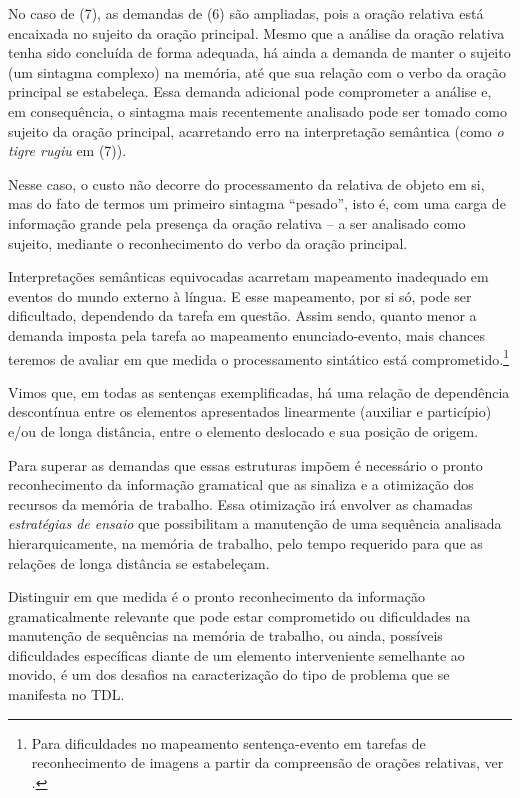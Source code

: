 \documentclass[output=paper,colorlinks,citecolor=brown,booklanguage=portuguese]{langscibook}
\begin{document}
No caso de (7), as demandas de (6) são ampliadas, pois a oração relativa está encaixada no sujeito da oração principal. Mesmo que a análise da oração relativa tenha sido concluída de forma adequada, há ainda a demanda de manter o sujeito (um sintagma complexo) na memória, até que sua relação com o verbo da oração principal se estabeleça. Essa demanda adicional pode comprometer a análise e, em consequência, o sintagma mais recentemente analisado pode ser tomado como sujeito da oração principal, acarretando erro na interpretação semântica (como \emph{o tigre rugiu} em (7)). 

Nesse caso, o custo não decorre do processamento da relativa de objeto em si, mas do fato de termos um primeiro sintagma “pesado”, isto é, com uma carga de informação grande pela presença da oração relativa – a ser analisado como sujeito, mediante o reconhecimento do verbo da oração principal. 

Interpretações semânticas equivocadas acarretam mapeamento inadequado em eventos do mundo externo à língua. E esse mapeamento, por si só, pode ser dificultado, dependendo da tarefa em questão. Assim sendo, quanto menor a demanda imposta pela tarefa ao mapeamento enunciado-evento, mais chances teremos de avaliar em que medida o processamento sintático está comprometido.\footnote{Para dificuldades no mapeamento sentença-evento em tarefas de reconhecimento de imagens a partir da compreensão de orações relativas, ver \citep{Correa2019}.} 

Vimos que, em todas as sentenças exemplificadas, há uma relação de dependência descontínua entre os elementos apresentados linearmente (auxiliar e particípio) e/ou de longa distância, entre o elemento deslocado e sua posição de origem. 

Para superar as demandas que essas estruturas impõem é necessário o pronto reconhecimento da informação gramatical que as sinaliza e a otimização dos recursos da memória de trabalho. Essa otimização irá envolver as chamadas \emph{estratégias de ensaio} \citep{Baddeley1990} que possibilitam a manutenção de uma sequência analisada hierarquicamente, na memória de trabalho, pelo tempo requerido para que as relações de longa distância se estabeleçam. 

Distinguir em que medida é o pronto reconhecimento da informação gramaticalmente relevante que pode estar comprometido ou dificuldades na manutenção de sequências na memória de trabalho, ou ainda, possíveis dificuldades específicas diante de um elemento interveniente semelhante ao movido, é um dos desafios na caracterização do tipo de problema que se manifesta no TDL. 
\end{document}
